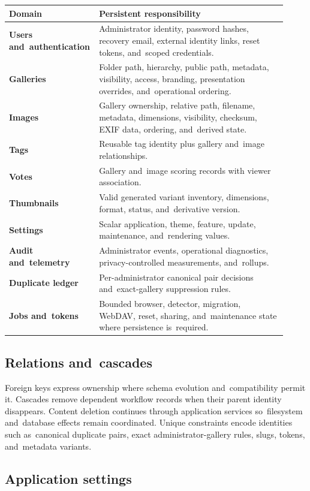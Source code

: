 \documentclass[11pt,a4paper]{article}
\begin{document}
\begin{longtable}{>{\bfseries}p{0.25\linewidth}p{0.67\linewidth}}
\toprule
Domain & Persistent responsibility\\
\midrule
\endhead
Users and~authentication & Administrator identity, password hashes, recovery
email, external identity links, reset tokens, and~scoped credentials.\\
Galleries & Folder path, hierarchy, public path, metadata, visibility, access,
branding, presentation overrides, and~operational ordering.\\
Images & Gallery ownership, relative path, filename, metadata, dimensions,
visibility, checksum, EXIF data, ordering, and~derived state.\\
Tags & Reusable tag identity plus gallery and~image relationships.\\
Votes & Gallery and~image scoring records with viewer association.\\
Thumbnails & Valid generated variant inventory, dimensions, format, status,
and~derivative version.\\
Settings & Scalar application, theme, feature, update, maintenance,
and~rendering values.\\
Audit and~telemetry & Administrator events, operational diagnostics,
privacy-controlled measurements, and~rollups.\\
Duplicate ledger & Per-administrator canonical pair decisions and~exact-gallery
suppression rules.\\
Jobs and~tokens & Bounded browser, detector, migration, WebDAV, reset, sharing,
and~maintenance state where persistence is~required.\\
\bottomrule
\end{longtable}

\subsection{Relations and~cascades}

Foreign keys express ownership where schema evolution and~compatibility permit
it. Cascades remove dependent workflow records when their parent identity
disappears. Content deletion continues through application services
so~filesystem and~database effects remain coordinated. Unique constraints encode
identities such as~canonical duplicate pairs, exact administrator-gallery rules,
slugs, tokens, and~metadata variants.

\subsection{Application settings}
\end{document}
